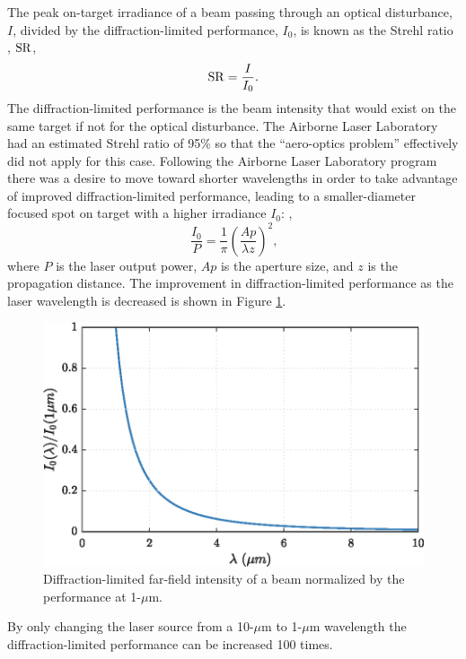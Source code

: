 The peak on-target irradiance of a beam passing through an optical disturbance, $I$, divided by the diffraction-limited performance, $I_0$, is known as the Strehl ratio \cite{Mahajan-1982-kkXM4eaB}, $\operatorname{SR}$,
\begin{equation}
  \operatorname{SR} = \frac{I}{I_0} \textrm{.}
  \label{eqn:01_strehl_ratio_definition}
\end{equation}
The diffraction-limited performance is the beam intensity that would exist on the same target if not for the optical disturbance.
The Airborne Laser Laboratory had an estimated Strehl ratio of 95\%\cite{Jumper-2013-8KtN3pue} so that the ``aero-optics problem'' effectively did not apply for this case.
Following the Airborne Laser Laboratory program there was a desire to move toward shorter wavelengths in order to take advantage of improved diffraction-limited performance, leading to a smaller-diameter focused spot on target with a higher irradiance $I_0$: \cite{Jumper-2001-6QDh7zDy},
\begin{equation}
  \frac{I_0}{P} = \frac{1}{\pi}\left(\frac{Ap}{\lambda z}\right)^2 \textrm{,}
  \label{eqn:01_farfield_intensity}
\end{equation}
where $P$ is the laser output power, $Ap$ is the aperture size, and $z$ is the propagation distance.
The improvement in diffraction-limited performance as the laser wavelength is decreased is shown in Figure \ref{fig:01_farfield_intensity}.
\begin{figure}
  \centering
  \includegraphics{../matlab/01_introduction/farfield_intensity.eps}
  \caption{Diffraction-limited far-field intensity of a beam normalized by the performance at 1-$\mu$m.}
  \label{fig:01_farfield_intensity}
\end{figure}
By only changing the laser source from a 10-$\mu$m to 1-$\mu$m wavelength the diffraction-limited performance can be increased 100 times.

